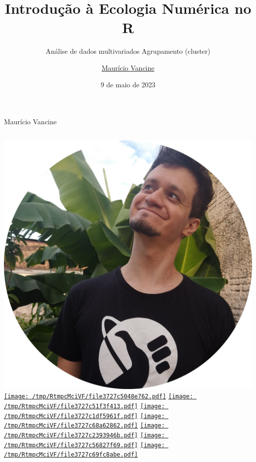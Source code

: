 \documentclass[
  ignorenonframetext,
]{beamer}
\title{Introdução à Ecologia Numérica no R}
\subtitle{Análise de dados multivariados Agrupamento (cluster)}
\author{\href{https://mauriciovancine.github.io/}{Maurício Vancine}}
\date{9 de maio de 2023}
\begin{document}
\frame{\titlepage}
\ifdefined\Shaded\renewenvironment{Shaded}{\begin{tcolorbox}[boxrule=0pt, interior hidden, sharp corners, frame hidden, borderline west={3pt}{0pt}{shadecolor}, enhanced, breakable]}{\end{tcolorbox}}\fi

\begin{frame}
\begin{block}{Maurício Vancine}
\protect\hypertarget{mauruxedcio-vancine}{}
\begin{columns}[T]
\begin{column}{0.4\textwidth}
\includegraphics{img/avatar.png}
\href{https://mauriciovancine.github.io/}{\protect\texttt{[image: /tmp/RtmpcMciVF/file3727c5048e762.pdf]}}
\href{mailto:mauricio.vancine@gmail.com}{\protect\texttt{[image: /tmp/RtmpcMciVF/file3727c51f3f413.pdf]}}
\href{https://mauriciovancine.github.io/cv/cv-mauricio-vancine-pt-academic-complete.html}{\protect\texttt{[image: /tmp/RtmpcMciVF/file3727c1df5961f.pdf]}}
\href{https://twitter.com/mauriciovancine}{\protect\texttt{[image: /tmp/RtmpcMciVF/file3727c68a62862.pdf]}}
\href{https://github.com/mauriciovancine}{\protect\texttt{[image: /tmp/RtmpcMciVF/file3727c2393946b.pdf]}}
\href{https://orcid.org/0000-0001-9650-7575}{\protect\texttt{[image: /tmp/RtmpcMciVF/file3727c56827f69.pdf]}}
\href{http://lattes.cnpq.br/9761288418931193}{\protect\texttt{[image: /tmp/RtmpcMciVF/file3727c69fc8abe.pdf]}}
\end{column}


\end{columns}
\end{block}
\end{frame}
\end{document}
